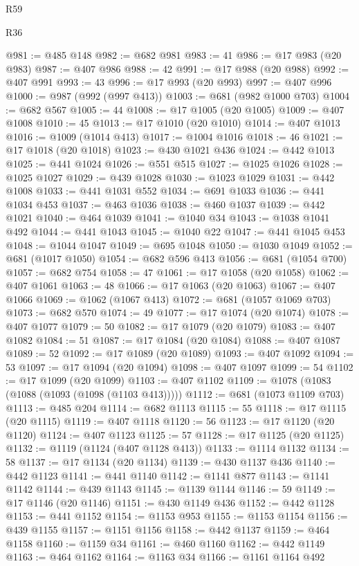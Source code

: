 \begin{lexlean}{R59}
\begin{lexlean}{R36}
\begin{coremodule}
{{{{{{{{{{{{{{{{{{{{{{{{{{{{{{{{{{{{{{{{{{{{{{{{{{{{{{{{{{{{{{{{{{{{{{{{{{{{{{{{{{@981 := @485 @148
@982 := @682 @981
@983 := 41
@986 := @17 @983 (@20 @983)
@987 := @407 @986
@988 := 42
@991 := @17 @988 (@20 @988)
@992 := @407 @991
@993 := 43
@996 := @17 @993 (@20 @993)
@997 := @407 @996
@1000 := @987 (@992 (@997 @413))
@1003 := @681 (@982 @1000 @703)
@1004 := @682 @567
@1005 := 44
@1008 := @17 @1005 (@20 @1005)
@1009 := @407 @1008
@1010 := 45
@1013 := @17 @1010 (@20 @1010)
@1014 := @407 @1013
@1016 := @1009 (@1014 @413)
@1017 := @1004 @1016
@1018 := 46
@1021 := @17 @1018 (@20 @1018)
@1023 := @430 @1021 @436
@1024 := @442 @1013
@1025 := @441 @1024
@1026 := @551 @515
@1027 := @1025 @1026
@1028 := @1025 @1027
@1029 := @439 @1028
@1030 := @1023 @1029
@1031 := @442 @1008
@1033 := @441 @1031 @552
@1034 := @691 @1033
@1036 := @441 @1034 @453
@1037 := @463 @1036
@1038 := @460 @1037
@1039 := @442 @1021
@1040 := @464 @1039
@1041 := @1040 @34
@1043 := @1038 @1041 @492
@1044 := @441 @1043
@1045 := @1040 @22
@1047 := @441 @1045 @453
@1048 := @1044 @1047
@1049 := @695 @1048
@1050 := @1030 @1049
@1052 := @681 (@1017 @1050)
@1054 := @682 @596 @413
@1056 := @681 (@1054 @700)
@1057 := @682 @754
@1058 := 47
@1061 := @17 @1058 (@20 @1058)
@1062 := @407 @1061
@1063 := 48
@1066 := @17 @1063 (@20 @1063)
@1067 := @407 @1066
@1069 := @1062 (@1067 @413)
@1072 := @681 (@1057 @1069 @703)
@1073 := @682 @570
@1074 := 49
@1077 := @17 @1074 (@20 @1074)
@1078 := @407 @1077
@1079 := 50
@1082 := @17 @1079 (@20 @1079)
@1083 := @407 @1082
@1084 := 51
@1087 := @17 @1084 (@20 @1084)
@1088 := @407 @1087
@1089 := 52
@1092 := @17 @1089 (@20 @1089)
@1093 := @407 @1092
@1094 := 53
@1097 := @17 @1094 (@20 @1094)
@1098 := @407 @1097
@1099 := 54
@1102 := @17 @1099 (@20 @1099)
@1103 := @407 @1102
@1109 := @1078 (@1083 (@1088 (@1093 (@1098 (@1103 @413)))))
@1112 := @681 (@1073 @1109 @703)
@1113 := @485 @204
@1114 := @682 @1113
@1115 := 55
@1118 := @17 @1115 (@20 @1115)
@1119 := @407 @1118
@1120 := 56
@1123 := @17 @1120 (@20 @1120)
@1124 := @407 @1123
@1125 := 57
@1128 := @17 @1125 (@20 @1125)
@1132 := @1119 (@1124 (@407 @1128 @413))
@1133 := @1114 @1132
@1134 := 58
@1137 := @17 @1134 (@20 @1134)
@1139 := @430 @1137 @436
@1140 := @442 @1123
@1141 := @441 @1140
@1142 := @1141 @877
@1143 := @1141 @1142
@1144 := @439 @1143
@1145 := @1139 @1144
@1146 := 59
@1149 := @17 @1146 (@20 @1146)
@1151 := @430 @1149 @436
@1152 := @442 @1128
@1153 := @441 @1152
@1154 := @1153 @953
@1155 := @1153 @1154
@1156 := @439 @1155
@1157 := @1151 @1156
@1158 := @442 @1137
@1159 := @464 @1158
@1160 := @1159 @34
@1161 := @460 @1160
@1162 := @442 @1149
@1163 := @464 @1162
@1164 := @1163 @34
@1166 := @1161 @1164 @492
}}}}}}}}}}}}}}}}}}}}}}}}}}}}}}}}}}}}}}}}}}}}}}}}}}}}}}}}}}}}}}}}}}}}}}}}}}}}}}}}}}
\end{coremodule}
\end{lexlean}
\end{lexlean}
